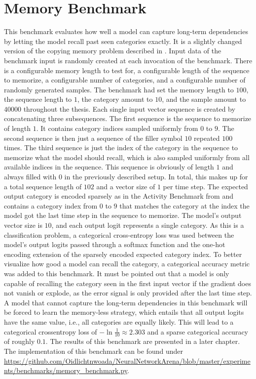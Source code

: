 \documentclass[draft,final]{vutinfth} %
\begin{document}
    \section{Memory Benchmark} \label{memory}
    This benchmark evaluates how well a model can capture long-term dependencies by letting the model recall past seen categories exactly.
    It is a slightly changed version of the copying memory problem described in \cite{UnitaryRNNs}.
    Input data of the benchmark input is randomly created at each invocation of the benchmark.
    There is a configurable memory length to test for, a configurable length of the sequence to memorize, a configurable number of categories, and a configurable number of randomly generated samples.
    The benchmark had set the memory length to $100$, the sequence length to $1$, the category amount to $10$, and the sample amount to $40000$ throughout the thesis.
    Each single input vector sequence is created by concatenating three subsequences.
    The first sequence is the sequence to memorize of length $1$.
    It contains category indices sampled uniformly from $0$ to $9$.
    The second sequence is then just a sequence of the filler symbol $10$ repeated $100$ times.
    The third sequence is just the index of the category in the sequence to memorize what the model should recall, which is also sampled uniformly from all available indices in the sequence.
    This sequence is obviously of length $1$ and always filled with $0$ in the previously described setup.
    In total, this makes up for a total sequence length of $102$ and a vector size of $1$ per time step.
    The expected output category is encoded sparsely as in the Activity Benchmark from  and contains a category index from $0$ to $9$ that matches the category at the index the model got the last time step in the sequence to memorize.
    The model's output vector size is $10$, and each output logit represents a single category.
    As this is a classification problem, a categorical cross-entropy loss was used between the model's output logits passed through a softmax function and the one-hot encoding extension of the sparsely encoded expected category index.
    To better visualize how good a model can recall the category, a categorical accuracy metric was added to this benchmark.
    It must be pointed out that a model is only capable of recalling the category seen in the first input vector if the gradient does not vanish or explode, as the error signal is only provided after the last time step.
    A model that cannot capture the long-term dependencies in this benchmark will be forced to learn the memory-less strategy, which entails that all output logits have the same value, i.e., all categories are equally likely.
    This will lead to a categorical crossentropy loss of $-\ln{\frac{1}{10}} \approx 2.303$ and a sparse categorical accuracy of roughly $0.1$.
    The results of this benchmark are presented in a later chapter.
    The implementation of this benchmark can be found under \url{https://github.com/Oidlichtnwoada/NeuralNetworkArena/blob/master/experiments/benchmarks/memory_benchmark.py}.
\end{document}
